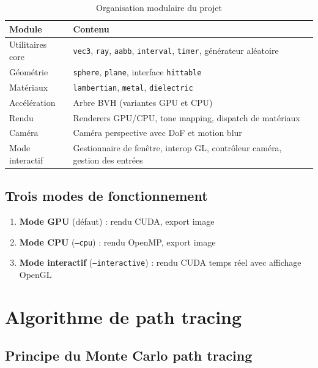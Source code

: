 \documentclass[12pt,a4paper]{article}
\begin{document}
\begin{table}[H]
\centering
\begin{tabular}{lp{9cm}}
\toprule
\textbf{Module} & \textbf{Contenu} \\
\midrule
Utilitaires core  & \texttt{vec3}, \texttt{ray}, \texttt{aabb}, \texttt{interval}, \texttt{timer}, générateur aléatoire \\
Géométrie         & \texttt{sphere}, \texttt{plane}, interface \texttt{hittable} \\
Matériaux         & \texttt{lambertian}, \texttt{metal}, \texttt{dielectric} \\
Accélération      & Arbre BVH (variantes GPU et CPU) \\
Rendu             & Renderers GPU/CPU, tone mapping, dispatch de matériaux \\
Caméra            & Caméra perspective avec DoF et motion blur \\
Mode interactif   & Gestionnaire de fenêtre, interop GL, contrôleur caméra, gestion des entrées \\
\bottomrule
\end{tabular}
\caption{Organisation modulaire du projet}
\end{table}

\subsection{Trois modes de fonctionnement}

\begin{enumerate}
    \item \textbf{Mode GPU} (défaut) : rendu CUDA, export image
    \item \textbf{Mode CPU} (\texttt{--cpu}) : rendu OpenMP, export image
    \item \textbf{Mode interactif} (\texttt{--interactive}) : rendu CUDA temps réel avec affichage OpenGL
\end{enumerate}

\section{Algorithme de path tracing}

\subsection{Principe du Monte Carlo path tracing}
\end{document}
